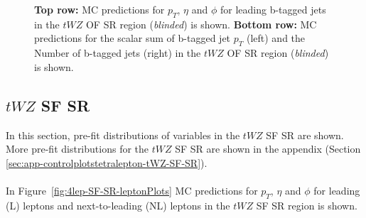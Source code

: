 \begin{figure}[htbp]
    \caption{\textbf{Top row:} MC predictions for $p_{T}$, $\eta$ and $\phi$ for leading b-tagged jets in the $tWZ$ OF SR region (\textit{blinded}) is shown. \textbf{Bottom row:} MC predictions for the scalar sum of b-tagged jet $p_{T}$ (left) and the Number of b-tagged jets (right) in the $tWZ$ OF SR region (\textit{blinded}) is shown.}
  \label{fig:4lep-OF-SR-bjetPlots}
\end{figure}


\subsection{$tWZ$ SF SR}
\label{sec:controlplotstetralepton-tWZ-SF-SR}


In this section, pre-fit distributions of variables in the $tWZ$ SF SR are shown. More pre-fit distributions for the $tWZ$ SF SR are shown in the appendix (Section \ref{sec:app-controlplotstetralepton-tWZ-SF-SR}).\\\\

In Figure~\ref{fig:4lep-SF-SR-leptonPlots} MC predictions for $p_{T}$, $\eta$ and $\phi$ for leading (L) leptons and next-to-leading (NL) leptons in the $tWZ$ SF SR region is shown.

